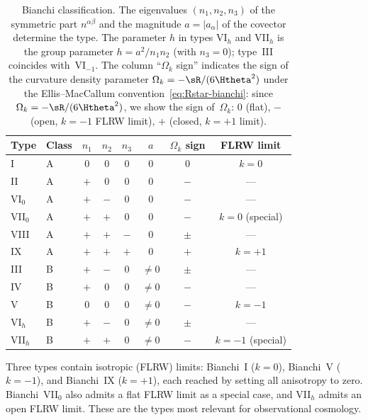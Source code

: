 \begin{table}[h]
\caption{Bianchi classification.  The eigenvalues $(n_1, n_2, n_3)$
of the symmetric part $n^{\alpha\beta}$ and the magnitude
$a = |a_\alpha|$ of the covector determine the type.  The
parameter $h$ in types VI$_h$ and VII$_h$ is the group parameter
$h = a^2/n_1 n_2$ (with $n_3 = 0$); type~III coincides
with~VI$_{-1}$.  The column ``$\Omega_k$ sign'' indicates the sign of
the curvature density parameter $\Omega_k = -\sR/(6\Htheta^2)$ under the
Ellis--MacCallum
convention~\eqref{eq:Rstar-bianchi}: since $\Omega_k = -\sR/(6\Htheta^2)$,
we show the sign of~$\Omega_k$: $0$ (flat), $-$ (open,
$k=-1$ FLRW limit), $+$ (closed, $k=+1$ limit).}
\label{tab:bianchi-types}
\centering\footnotesize\setlength{\tabcolsep}{3.5pt}
\begin{tabular}{llcccccc}
\toprule
Type & Class & $n_1$ & $n_2$ & $n_3$ & $a$
  & $\Omega_k$ sign & FLRW limit \\
\midrule
I      & A & $0$ & $0$ & $0$ & $0$
  & $0$ & $k = 0$ \\
II     & A & $+$ & $0$ & $0$ & $0$
  & $-$ & --- \\
VI$_0$ & A & $+$ & $-$ & $0$ & $0$
  & $-$ & --- \\
VII$_0$& A & $+$ & $+$ & $0$ & $0$
  & $-$ & $k = 0$ (special) \\
VIII   & A & $+$ & $+$ & $-$ & $0$
  & $\pm$ & --- \\
IX     & A & $+$ & $+$ & $+$ & $0$
  & $+$ & $k = +1$ \\
\midrule
III    & B & $+$ & $-$ & $0$ & $\neq 0$
  & $\pm$ & --- \\
IV     & B & $+$ & $0$ & $0$ & $\neq 0$
  & $-$ & --- \\
V      & B & $0$ & $0$ & $0$ & $\neq 0$
  & $-$ & $k = -1$ \\
VI$_h$ & B & $+$ & $-$ & $0$ & $\neq 0$
  & $\pm$ & --- \\
VII$_h$& B & $+$ & $+$ & $0$ & $\neq 0$
  & $-$ & $k = -1$ (special) \\
\bottomrule
\end{tabular}
\end{table}

Three types contain isotropic (FLRW) limits: Bianchi~I
($k = 0$), Bianchi~V ($k = -1$), and Bianchi~IX ($k = +1$),
each reached by setting all anisotropy to zero.  Bianchi~VII$_0$
also admits a flat FLRW limit as a special case, and VII$_h$
admits an open FLRW limit.  These are the types most relevant
for observational cosmology.


